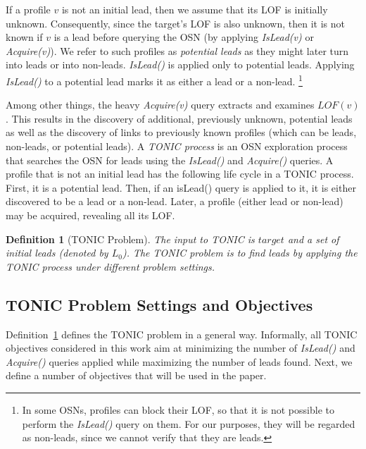\documentclass[journal]{IEEEtran}
\newcommand{\islead}[1]{{\em IsLead(#1)}}
\newcommand{\acquire}[1]{{\em Acquire(#1)}}
\newtheorem{definition}{Definition}
\begin{document}
If a profile $v$ is not an initial lead, then we assume that its LOF is initially unknown.
Consequently, since the target's LOF is also unknown, then it is not known if $v$ is a lead before querying the OSN  (by applying \islead{v} or \acquire{v}). We refer to such profiles as {\em potential leads} as they might later turn into leads or into non-leads. \islead{} is applied only to potential leads.  Applying \islead{} to a potential lead marks it as either a lead or a non-lead. %
\footnote{In some OSNs, profiles can block their LOF, so that it is not possible to perform the \islead{} query on them. For our purposes, they will be regarded as non-leads, since we cannot verify that they are leads.} 





%

Among other things, the heavy \acquire{v} query extracts and examines $LOF(v)$. This results in the discovery of additional, previously unknown, potential leads as well as the discovery of links to previously known profiles (which can be leads, non-leads, or potential leads). A {\em TONIC process} is an OSN exploration process that searches the OSN for leads using the \islead{} and \acquire{} queries.
A profile that is not an initial lead has the following life cycle in a TONIC process. First, it is a potential lead. Then, if an isLead() query is applied to it, it is either discovered to be a lead or a non-lead. Later, a profile (either lead or non-lead) may be acquired, revealing all its LOF. 



  

\begin{definition}[TONIC Problem]
The input to TONIC is $target$ and a set of {\em initial leads} (denoted by \(L_0\)). The TONIC problem is to find leads by applying the TONIC process under different problem settings. 
\label{def:btf}
\end{definition}

\subsection{TONIC Problem Settings and Objectives}
Definition~\ref{def:btf} defines the TONIC problem in a general way. 
Informally, all TONIC objectives considered in this work aim at minimizing the number of \islead{} and \acquire{} queries applied while maximizing the number of leads found. Next, we define a number of objectives that will be used in the paper.
\end{document}
